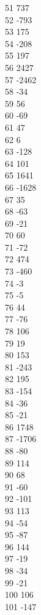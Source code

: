 { 51	737 \\
 52	-793 \\
 53	175 \\
 54	-208 \\
 55	197 \\
 56	2427 \\
 57	-2462 \\
 58	-34 \\
 59	56 \\
 60	-69 \\
 61	47 \\
 62	6 \\
 63	-128 \\
 64	101 \\
 65	1641 \\
 66	-1628 \\
 67	35 \\
 68	-63 \\
 69	-21 \\
 70	60 \\
 71	-72 \\
 72	474 \\
 73	-460 \\
 74	-3 \\
 75	-5 \\
 76	44 \\
 77	-76 \\
 78	106 \\
 79	19 \\
 80	153 \\
 81	-243 \\
 82	195 \\
 83	-154 \\
 84	-36 \\
 85	-21 \\
 86	1748 \\
 87	-1706 \\
 88	-80 \\
 89	114 \\
 90	68 \\
 91	-60 \\
 92	-101 \\
 93	113 \\
 94	-54 \\
 95	-87 \\
 96	144 \\
 97	-19 \\
 98	-34 \\
 99	-21 \\
 100	106 \\
 101	-147 \\
}
